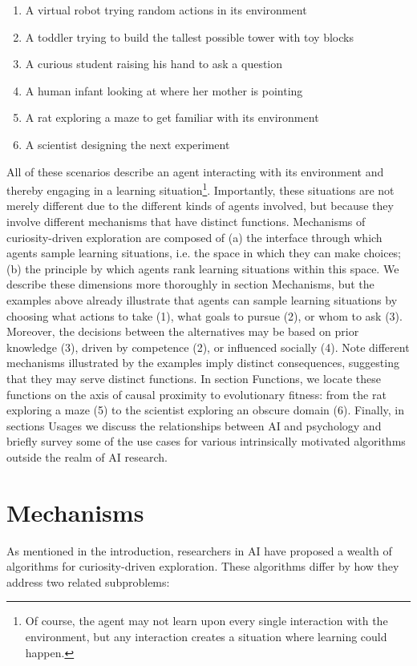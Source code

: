 \begin{enumerate}
    \item A virtual robot trying random actions in its environment
    \item A toddler trying to build the tallest possible tower with toy blocks
    \item A curious student raising his hand to ask a question
    \item A human infant looking at where her mother is pointing
    \item A rat exploring a maze to get familiar with its environment
    \item A scientist designing the next experiment
\end{enumerate}

All of these scenarios describe an agent interacting with its environment and thereby engaging in a learning situation\footnote{Of course, the agent may not learn upon every single interaction with the environment, but any interaction creates a situation where learning could happen.}. Importantly, these situations are not merely different due to the different kinds of agents involved, but because they involve different mechanisms that have distinct functions. Mechanisms of curiosity-driven exploration are composed of (a) the interface through which agents sample learning situations, i.e. the space in which they can make choices; (b) the principle by which agents rank learning situations within this space. We describe these dimensions more thoroughly in section Mechanisms, but the examples above already illustrate that agents can sample learning situations by choosing what actions to take (1), what goals to pursue (2), or whom to ask (3). Moreover, the decisions between the alternatives may be based on prior knowledge (3), driven by competence (2), or influenced socially (4). Note different mechanisms illustrated by the examples imply distinct consequences, suggesting  that they may serve distinct functions. In section Functions, we locate these functions on the axis of causal proximity to evolutionary fitness: from the rat exploring a maze (5) to the scientist exploring an obscure domain (6). Finally, in sections Usages we discuss the relationships between AI and psychology and briefly survey some of the use cases for various intrinsically motivated algorithms outside the realm of AI research.

\section{Mechanisms}
As mentioned in the introduction, researchers in AI have proposed a wealth of algorithms for curiosity-driven exploration. These algorithms differ by how they address two related subproblems:

